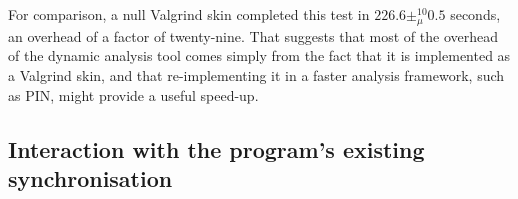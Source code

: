 For comparison, a null Valgrind skin completed this test in $226.6
\pm_\mu^{10} 0.5$ seconds, an overhead of a factor of twenty-nine.  That
suggests that most of the overhead of the dynamic analysis tool comes
simply from the fact that it is implemented as a Valgrind skin, and
that re-implementing it in a faster analysis framework, such as
PIN\cite{Luk2005}, might provide a useful speed-up.

\subsection{Interaction with the program's existing synchronisation}

\begin{figure}
  \hspace{-2mm}
  \hfill
\end{figure}
